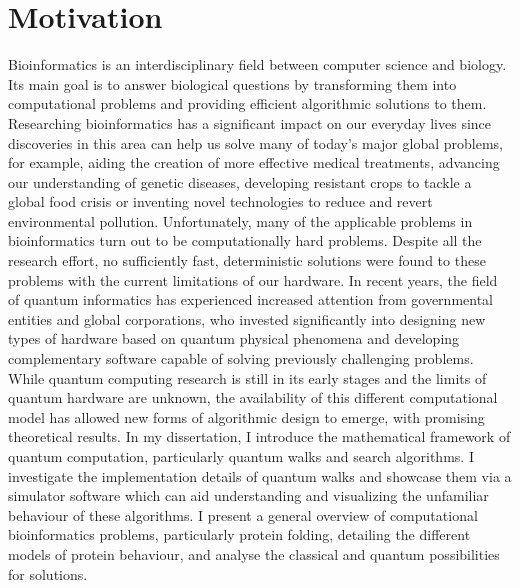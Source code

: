 \chapter{Motivation}

Bioinformatics is an interdisciplinary field between computer science and biology. Its main goal is to answer biological questions by transforming them into computational problems and providing efficient algorithmic solutions to them. Researching bioinformatics has a significant impact on our everyday lives since discoveries in this area can help us solve many of today’s major global problems, for example, aiding the creation of more effective medical treatments, advancing our understanding of genetic diseases, developing resistant crops to tackle a global food crisis or inventing novel technologies to reduce and revert environmental pollution. Unfortunately, many of the applicable problems in bioinformatics turn out to be computationally hard problems. Despite all the research effort, no sufficiently fast, deterministic solutions were found to these problems with the current limitations of our hardware. In recent years, the field of quantum informatics has experienced increased attention from governmental entities and global corporations, who invested significantly into designing new types of hardware based on quantum physical phenomena and developing complementary software capable of solving previously challenging problems. While quantum computing research is still in its early stages and the limits of quantum hardware are unknown, the availability of this different computational model has allowed new forms of algorithmic design to emerge, with promising theoretical results. In my dissertation, I introduce the mathematical framework of quantum computation, particularly quantum walks and search algorithms. I investigate the implementation details of quantum walks and showcase them via a simulator software which can aid understanding and visualizing the unfamiliar behaviour of these algorithms. I present a general overview of computational bioinformatics problems, particularly protein folding, detailing the different models of protein behaviour, and analyse the classical and quantum possibilities for solutions. 
